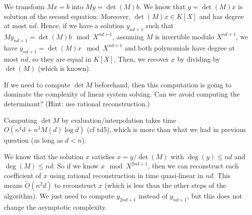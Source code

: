 \documentclass[11pt]{exam}
\theoremstyle{definition}
\begin{document}
\begin{questions}
\begin{solution}
		We transform $Mx = b$ into $My = \det(M)b$. We know that $y = \det(M)x$ is solution of the second equation. Moreover, $\det(M)x \in K[X]$ and has degree at most $nd$. Hence, if we have a solution $y_{nd+1}$ such that $My_{nd+1} = \det(M)b \mod X^{nd+1}$, assuming $M$ is invertible modulo $X^{nd+1}$, we have $y_{nd+1} = \det(M)x \mod X^{nd+1}$ and both polynomials have degree at most $nd$, so they are equal in $K[X]$. Then, we recover $x$ by dividing by $\det(M)$ (which is known).
	\end{solution}
	
	\question If we need to compute $\det M$ beforehand, then this computation is going
	to dominate the complexity of linear system solving. Can we avoid computing
	the determinant? (Hint: use rational reconstruction.)
	
	\begin{solution}
		Computing $\det M$ by evaluation/interpolation takes time $O(n^4d + n^3 M(d) \log d)$ (cf td5), which is more than what we had in previous question (as long as $d < n$).
		
		We know that the solution $x$ satisfies $x = y/\det(M)$ with $\deg(y) \leq nd$ and $\deg(M) \leq nd$. So if we know $x \mod X^{2nd+1}$, then we can reconstruct each coefficient of $x$ using rational reconstruction in time quasi-linear in $nd$. This means $\tilde{O}(n^2d)$ to reconstruct $x$ (which is less than the other steps of the algorithm). We just need to compute $y_{2nd+1}$ instead of $y_{nd+1}$, but this does not change the asymptotic complexity.
	\end{solution}
	
	
\end{questions}
\end{document}
